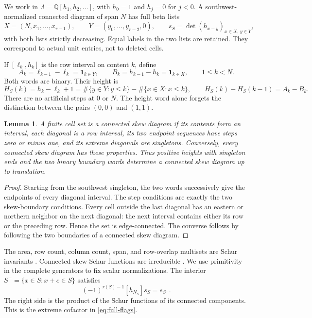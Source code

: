 \documentclass[11pt,a4paper]{amsart}
\numberwithin{equation}{section}
\theoremstyle{plain}
\newtheorem{lemma}[theorem]{Lemma}
\theoremstyle{definition}
\newcommand{\Lam}{\Lambda}
\newcommand{\Q}{\mathbb Q}
\newcommand{\one}{\mathbf1}
\begin{document}
We work in \(\Lam=\Q[h_1,h_2,\ldots]\), with \(h_0=1\) and \(h_j=0\) for \(j<0\).  A southwest-normalized connected diagram of span \(N\) has full beta lists
\begin{equation}\label{eq:full-flags}
 X=(N,x_1,\ldots,x_{r-1}),\qquad
 Y=(y_0,\ldots,y_{r-2},0),\qquad
 s_S=\det(h_{x-y})_{x\in X,\,y\in Y},
\end{equation}
with both lists strictly decreasing.  Equal labels in the two lists are retained.  They correspond to actual unit entries, not to deleted cells.

If \([\ell_k,h_k]\) is the row interval on content \(k\), define
\begin{equation}\label{eq:boundary-words}
 A_k=\ell_{k-1}-\ell_k=\one_{k\in Y},\qquad
 B_k=h_{k-1}-h_k=\one_{k\in X},\qquad 1\le k<N.
\end{equation}
Both words are binary.  Their height is
\begin{equation}\label{eq:height}
 H_S(k)=h_k-\ell_k+1
 =\#\{y\in Y:y\le k\}-\#\{x\in X:x\le k\},
 \qquad H_S(k)-H_S(k-1)=A_k-B_k.
\end{equation}
There are no artificial steps at \(0\) or \(N\).  The height word alone forgets the distinction between the pairs \((0,0)\) and \((1,1)\).

\begin{lemma}\label{lem:diagonal-reconstruction}
A finite cell set is a connected skew diagram if its contents form an interval, each diagonal is a row interval, its two endpoint sequences have steps zero or minus one, and its extreme diagonals are singletons.  Conversely, every connected skew diagram has these properties.  Thus positive heights with singleton ends and the two binary boundary words determine a connected skew diagram up to translation.
\end{lemma}
\begin{proof}
Starting from the southwest singleton, the two words successively give the endpoints of every diagonal interval.  The step conditions are exactly the two skew-boundary conditions.  Every cell outside the last diagonal has an eastern or northern neighbor on the next diagonal: the next interval contains either its row or the preceding row.  Hence the set is edge-connected.  The converse follows by following the two boundaries of a connected skew diagram.
\end{proof}

The area, row count, column count, span, and row-overlap multisets are Schur invariants \cite{Reiner2007Coincidences}.  Connected skew Schur functions are irreducible \cite{Barekat2009CoincidencesCorrigendum}.  We use primitivity in the complete generators to fix scalar normalizations.  The interior
\(S^- =\{x\in S:x+e\in S\}\) satisfies
\begin{equation}\label{eq:corner}
 (-1)^{r(S)-1}[h_{N_S}]s_S=s_{S^-}.
\end{equation}
The right side is the product of the Schur functions of its connected components.  This is the extreme cofactor in \eqref{eq:full-flags}.
\end{document}
